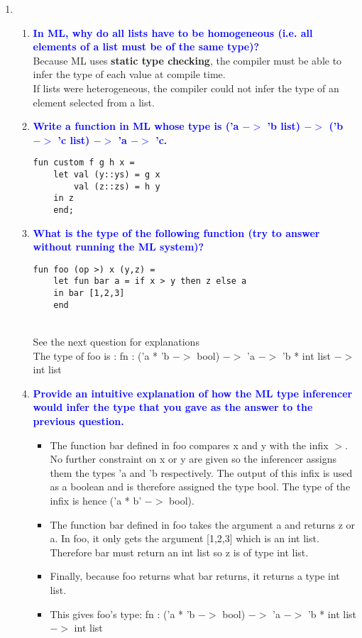 \documentclass[10pt]{article}
\begin{document}
\begin{enumerate}
    
    \item
    \begin{enumerate}
        \item \textbf{\textcolor{blue}{In ML, why do all lists have to be homogeneous (i.e. all elements of a list must be of the same type)?}}
            \\ Because ML uses \textbf{static type checking}, the compiler must be able to infer the type of each value at compile time. 
            \\ If lists were heterogeneous, the compiler could not infer the type of an element selected from a list.
        \item \textbf{\textcolor{blue}{Write a function in ML whose type is ('a $->$ 'b list) $->$ ('b $->$ 'c list) $->$ 'a $->$ 'c.}}
            \begin{verbatim}
fun custom f g h x = 
    let val (y::ys) = g x
        val (z::zs) = h y
    in z
    end;
            \end{verbatim}
        \item \textbf{\textcolor{blue}{What is the type of the following function (try to answer without running the ML
        system)?}}
        \begin{verbatim}
fun foo (op >) x (y,z) =
    let fun bar a = if x > y then z else a
    in bar [1,2,3]
    end
        \end{verbatim}
            \\ See the next question for explanations
            \\ The type of foo is : fn : ('a * 'b $->$ bool) $->$ 'a $->$ 'b * int list $->$ int list
        \item \textbf{\textcolor{blue}{Provide an intuitive explanation of how the ML type inferencer would infer the type that you gave as the answer to the previous question.}}
            \begin{itemize}
                \item The function bar defined in foo compares x and y with the infix $>$. No further constraint on x or y are given so the inferencer assigns them the types 'a and 'b respectively. The output of this infix is used as a boolean and is therefore assigned the type bool. The type of the infix is hence ('a * b' $->$ bool).
                \item The function bar defined in foo takes the argument a and returns z or a. In foo, it only gets the argument [1,2,3] which is an int list. Therefore bar must return an int list so z is of type int list.
                \item Finally, because foo returns what bar returns, it returns a type int list.
                \item This gives foo's type: fn : ('a * 'b $->$ bool) $->$ 'a $->$ 'b * int list $->$ int list
            \end{itemize}      
    \end{enumerate}
    

\end{enumerate}
\end{document}
